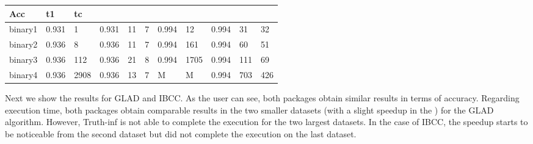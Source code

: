 \documentclass[letterpaper,10pt,english]{sphinxmanual}
\begin{document}
\begin{savenotes}
\begin{tabulary}{\linewidth}[t]{|T|T|T|T|T|T|T|T|T|T|T|}
Acc
&\sphinxstyletheadfamily 
t1
&\sphinxstyletheadfamily 
tc
\\
\hline
binary1
&
0.931
&
1
&
0.931
&
11
&
7
&
0.994
&
12
&
0.994
&
31
&
32
\\
\hline
binary2
&
0.936
&
8
&
0.936
&
11
&
7
&
0.994
&
161
&
0.994
&
60
&
51
\\
\hline
binary3
&
0.936
&
112
&
0.936
&
21
&
8
&
0.994
&
1705
&
0.994
&
111
&
69
\\
\hline
binary4
&
0.936
&
2908
&
0.936
&
13
&
7
&
M
&
M
&
0.994
&
703
&
426
\\
\hline
\end{tabulary}
\par
\sphinxattableend\end{savenotes}

Next we show the results for GLAD and IBCC. As the user can see, both packages obtain similar results
in terms of accuracy. Regarding execution time, both packages obtain comparable results
in the two smaller datasets (with a slight speedup in the ) for the GLAD algorithm. However,
Truth-inf is not able to complete the execution for the two largest datasets.
In the case of IBCC, the speedup starts to be noticeable from the second dataset but did not complete the execution 
on the last dataset. 
\end{document}
